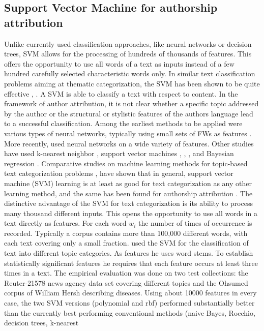 \subsection{Support Vector Machine for authorship attribution}
Unlike currently used
classification approaches, like neural networks or decision trees, SVM allows for the processing of hundreds of thousands of features. This offers the opportunity to use all words of a text as inputs instead of a few hundred carefully selected characteristic words only. In similar text classification problems aiming at thematic categorization, the SVM has been shown to be quite effective \cite{joachims1998making}, \cite{dumais1998inductive}.
A SVM is able to classify a text with respect to content. In the framework of author attribution, it is not clear whether a specific topic addressed by the author or the structural or stylistic features of the authors language lead to a successful classification.
Among the earliest methods to be applied were various types of neural networks, typically using small sets of FWs as features \cite{holmes1995forensic}.
More recently, \citeauthor{hirst2007bigrams} used neural networks on a wide variety of features. Other studies have used k-nearest neighbor \cite{zhao2005effective}, support vector machines \cite{diederich2003authorship}, \cite{koppel2005determining}, \cite{zheng2006framework}, and Bayesian regression \cite{madigan2005author}.
Comparative studies on machine learning methods for topic-based text categorization problems \cite{dumais1998inductive}, \cite{joachims1998making} have shown that in general, support vector machine (SVM) learning is at least as good for text categorization as any other
learning method, and the same has been found for authorship attribution \cite{zheng2006framework}.
The distinctive advantage of the SVM for text categorization is its ability to process many thousand different inputs. This opens the opportunity to use all words
in a text directly as features. For each word $w_i$ the number of times of occurrence is recorded. Typically a corpus contains more than 100,000 different words,
with each text covering only a small fraction.
\citeauthor{joachims1998making} \cite{joachims1998making} used the SVM for the classification of text into different topic categories. As features he uses word stems. To establish statistically significant features he requires that each feature occurs at least three times in a text. The empirical evaluation was done
on two test collections: the Reuter-21578 news agency
data set covering different topics and the Ohsumed corpus of William Hersh describing diseases. Using about 10000 features in every case, the two SVM versions (polynomial and rbf) performed substantially better than the currently best performing conventional methods (naive Bayes, Rocchio, decision trees, k-nearest
